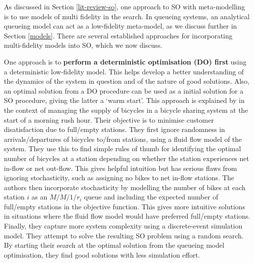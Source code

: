 \documentclass[12pt,a4paper]{article}
\begin{document}
As discussed in Section \ref{lit-review-so}, one approach to SO with meta-modelling is to use models of multi fidelity in the search. In queueing systems, an analytical queueing model can act as a low-fidelity meta-model, as we discuss further in Section \ref{models}. There are several established approaches for incorporating multi-fidelity models into SO, which we now discuss.

One approach is to \textbf{perform a deterministic optimisation (DO) first} using a deterministic low-fidelity model. This helps develop a better understanding of the dynamics of the system in question and of the nature of good solutions. Also, an optimal solution from a DO procedure can be used as a initial solution for a SO procedure, giving the latter a `warm start'. This approach is explained by \cite{jian2015introduction} in the context of managing the supply of bicycles in a bicycle sharing system at the start of a morning rush hour. Their objective is to minimise customer disatisfaction due to full/empty stations. They first ignore randomness in arrivals/departures of bicycles to/from stations, using a fluid flow model of the system. They use this to find simple rules of thumb for identifying the optimal number of bicycles at a station depending on whether the station experiences net in-flow or net out-flow. This gives helpful intuition but has serious flaws from ignoring stochasticity, such as assigning no bikes to net in-flow stations. The authors then incorporate stochasticity by modelling the number of bikes at each station $i$ as an $M/M/1/r_i$ queue and including the expected number of full/empty stations in the objective function. This gives more intuitive solutions in situations where the fluid flow model would have preferred full/empty stations. Finally, they capture more system complexity using a discrete-event simulation model. They attempt to solve the resulting SO problem using a random search. By starting their search at the optimal solution from the queueing model optimisation, they find good solutions with less simulation effort.
\end{document}

